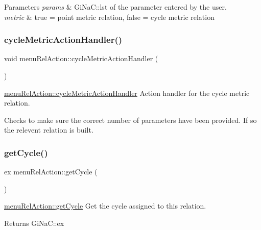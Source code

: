 \begin{DoxyParams}{Parameters}
{\em params} & Gi\+Na\+C\+::lst of the parameter entered by the user. \\
\hline
{\em metric} & true = point metric relation, false = cycle metric relation \\
\hline
\end{DoxyParams}
\mbox{\label{classmenu_rel_action_adbd43b99466f9ad2cde1934e1599ae4c}} 
\subsubsection{\texorpdfstring{cycle\+Metric\+Action\+Handler()}{cycleMetricActionHandler()}}
{\footnotesize\ttfamily void menu\+Rel\+Action\+::cycle\+Metric\+Action\+Handler (\begin{DoxyParamCaption}{ }\end{DoxyParamCaption})}



\mbox{\hyperlink{classmenu_rel_action_adbd43b99466f9ad2cde1934e1599ae4c}{menu\+Rel\+Action\+::cycle\+Metric\+Action\+Handler}} Action handler for the cycle metric relation. 

Checks to make sure the correct number of parameters have been provided. If so the relevent relation is built. \mbox{\label{classmenu_rel_action_acb80ac433c901f22dbddcff7445adf24}} 
\subsubsection{\texorpdfstring{get\+Cycle()}{getCycle()}}
{\footnotesize\ttfamily ex menu\+Rel\+Action\+::get\+Cycle (\begin{DoxyParamCaption}{ }\end{DoxyParamCaption})}



\mbox{\hyperlink{classmenu_rel_action_acb80ac433c901f22dbddcff7445adf24}{menu\+Rel\+Action\+::get\+Cycle}} Get the cycle assigned to this relation. 

\begin{DoxyReturn}{Returns}
Gi\+Na\+C\+::ex 
\end{DoxyReturn}
\mbox{\label{classmenu_rel_action_aca0baeed9c6a266d677dae8dfb25d65b}} 
